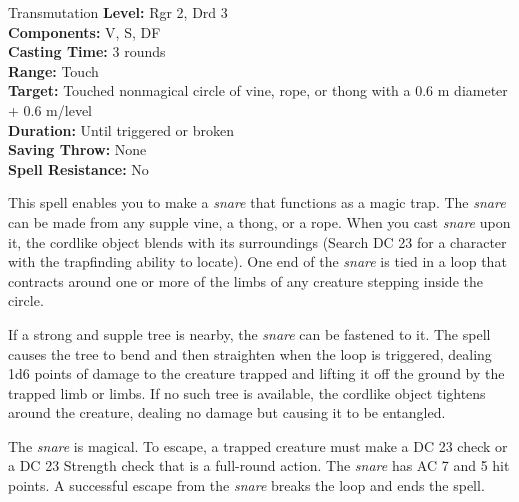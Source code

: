 {Transmutation}
{
	\textbf{Level:}
	Rgr 2, Drd 3\\
	\textbf{Components:}
	V, S, DF\\
	\textbf{Casting Time:}
	3 rounds\\
	\textbf{Range:}
	Touch\\
	\textbf{Target:}
	Touched nonmagical circle of vine, rope, or thong with a 0.6 m diameter + 0.6 m/level\\
	\textbf{Duration:}
	Until triggered or broken\\
	\textbf{Saving Throw:}
	None\\
	\textbf{Spell Resistance:}
	No\\
}
{
	This spell enables you to make a \emph{snare} that functions as a magic trap. The \emph{snare} can be made from any supple vine, a thong, or a rope. When you cast \emph{snare} upon it, the cordlike object blends with its surroundings (Search DC 23 for a character with the trapfinding ability to locate). One end of the \emph{snare} is tied in a loop that contracts around one or more of the limbs of any creature stepping inside the circle.

	If a strong and supple tree is nearby, the \emph{snare} can be fastened to it. The spell causes the tree to bend and then straighten when the loop is triggered, dealing 1d6 points of damage to the creature trapped and lifting it off the ground by the trapped limb or limbs. If no such tree is available, the cordlike object tightens around the creature, dealing no damage but causing it to be entangled.

	The \emph{snare} is magical. To escape, a trapped creature must make a DC 23  check or a DC 23 Strength check that is a full-round action. The \emph{snare} has AC 7 and 5 hit points. A successful escape from the \emph{snare} breaks the loop and ends the spell.

}

